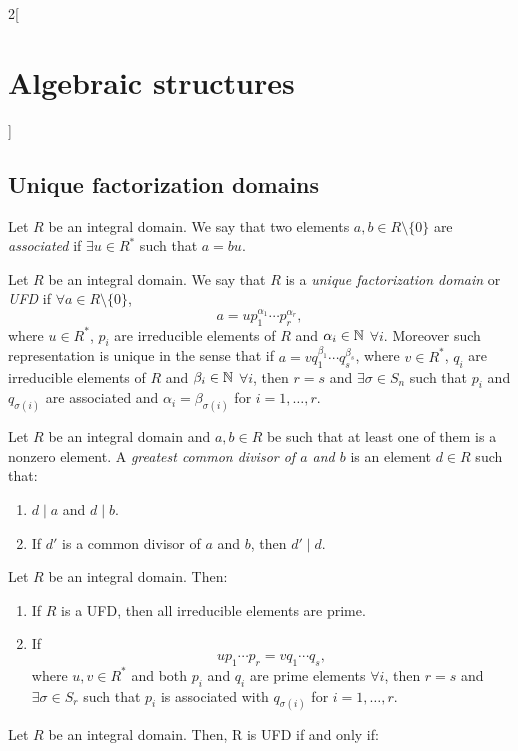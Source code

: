 \documentclass[../../../main.tex]{subfiles}
\begin{document}
\begin{multicols}{2}[\section{Algebraic structures}]
\subsection{Unique factorization domains}
\begin{definition}
    Let $R$ be an integral domain. We say that two elements $a,b\in R\setminus\{0\}$ are \textit{associated} if $\exists u\in R^*$ such that $a=bu$.
\end{definition}
\begin{definition}
    Let $R$ be an integral domain. We say that $R$ is a \textit{unique factorization domain} or \textit{UFD} if $\forall a\in R\setminus\{0\}$, $$a=up_1^{\alpha_1}\cdots p_r^{\alpha_r},$$ where $u\in R^*$, $p_i$ are irreducible elements of $R$ and $\alpha_i\in\mathbb{N}$ $\forall i$. Moreover such representation is unique in the sense that if $a=vq_1^{\beta_1}\cdots q_s^{\beta_s}$, where $v\in R^*$, $q_i$ are irreducible elements of $R$ and $\beta_i\in\mathbb{N}$ $\forall i$, then $r=s$ and $\exists\sigma\in S_n$ such that $p_i$ and $q_{\sigma(i)}$ are associated and $\alpha_i=\beta_{\sigma(i)}$ for $i=1,\ldots,r$.
\end{definition}
\begin{definition}
    Let $R$ be an integral domain and $a,b\in R$ be such that at least one of them is a nonzero element. A \textit{greatest common divisor of $a$ and $b$} is an element $d\in R$ such that:
    \begin{enumerate}
        \item $d\mid a$ and $d\mid b$.
        \item If $d'$ is a common divisor of $a$ and $b$, then $d'\mid d$.
    \end{enumerate}
\end{definition}
\begin{prop}
    Let $R$ be an integral domain. Then:
    \begin{enumerate}
        \item If $R$ is a UFD, then all irreducible elements are prime.
        \item If $$up_1\cdots p_r=vq_1\cdots q_s,$$ where $u,v\in R^*$ and both $p_i$ and $q_i$ are prime elements $\forall i$, then $r=s$ and $\exists\sigma\in S_r$ such that $p_i$ is associated with $q_{\sigma(i)}$ for $i=1,\ldots,r$.
    \end{enumerate}
\end{prop}
\begin{theorem}
    Let $R$ be an integral domain. Then, R is UFD if and only if:
    \begin{enumerate}

\end{enumerate}
\end{theorem}
\end{multicols}
\end{document}
